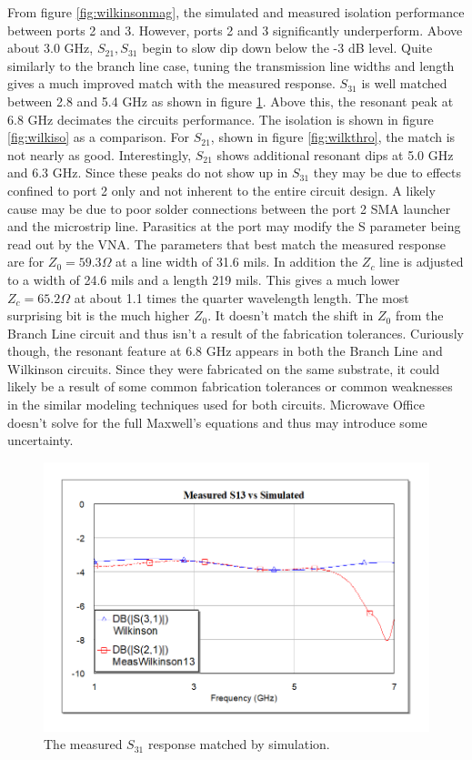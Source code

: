 \documentclass[twocolumn, aps, apl]{revtex4-1}
\begin{document}
From figure \ref{fig:wilkinsonmag}, the simulated and measured isolation performance between ports 2 and 3. However, ports 2 and 3 significantly underperform. Above about 3.0 GHz, $S_{21}, S_{31}$ begin to slow dip down below the -3 dB level. Quite similarly to the branch line case, tuning the transmission line widths and length gives a much improved match with the measured response. $S_{31}$ is well matched between 2.8 and 5.4 GHz as shown in figure \ref{fig:wilkcoup}. Above this, the resonant peak at 6.8 GHz decimates the circuits performance. The isolation is shown in figure \ref{fig:wilkiso} as a comparison. For $S_{21}$, shown in figure \ref{fig:wilkthro}, the match is not nearly as good. Interestingly, $S_{21}$ shows additional resonant dips at 5.0 GHz and 6.3 GHz. Since these peaks do not show up in $S_{31}$ they may be due to effects confined to port 2 only and not inherent to the entire circuit design. A likely cause may be due to poor solder connections between the port 2 SMA launcher and the microstrip line. Parasitics at the port may modify the S parameter being read out by the VNA. The parameters that best match the measured response are for $Z_0 = 59.3 \Omega$ at a line width of 31.6 mils. In addition the $Z_c$ line is adjusted to a width of 24.6 mils and a length 219 mils. This gives a much lower $Z_c = 65.2 \Omega$ at about 1.1 times the quarter wavelength length. The most surprising bit is the much higher $Z_0$. It doesn't match the shift in $Z_0$ from the Branch Line circuit and thus isn't a result of the fabrication tolerances. Curiously though, the resonant feature at 6.8 GHz appears in both the Branch Line and Wilkinson circuits. Since they were fabricated on the same substrate, it could likely be a result of some common fabrication tolerances or common weaknesses in the similar modeling techniques used for both circuits. Microwave Office doesn't solve for the full Maxwell's equations and thus may introduce some uncertainty.


\begin{figure}[!htbp]
    \centering
    \includegraphics[scale=0.4]{WilkinsonCoupled.png}
    \caption{The measured $S_{31}$ response matched by simulation. }
    \label{fig:wilkcoup}
\end{figure}
\end{document}
